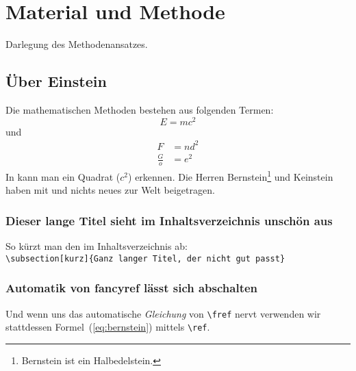 \chapter{Material und Methode}\label{chap:material und methode}
Darlegung des Methodenansatzes.

\section{Über Einstein}\label{sec:ueber einstein}
Die mathematischen Methoden bestehen aus folgenden Termen:
\begin{equation}
	\label{eq:einstein}
	E = mc^2
\end{equation}
und
\begin{align}
	\label{eq:bernstein}
	F &= nd^2\\
	\label{eq:keinstein}
	\frac{G}{o} &= e^2
\end{align}
In  kann man ein Quadrat ($c^2$) erkennen. Die Herren Bernstein\footnote{Bernstein ist ein Halbedelstein.} und Keinstein haben mit  und  nichts neues zur Welt beigetragen.

\subsection{Dieser lange Titel sieht im Inhaltsverzeichnis unschön aus}\label{sec:fancyref1}
So kürzt man den im Inhaltsverzeichnis ab:\\
\verb+\subsection[kurz]{Ganz langer Titel, der nicht gut passt}+
\subsection[Automatik von fancyref]{Automatik von fancyref lässt sich abschalten}\label{sec:fancyref}
Und wenn uns das automatische \emph{Gleichung} von \verb+\fref+ nervt verwenden wir stattdessen Formel~(\ref{eq:bernstein}) mittels \verb+\ref+.
\newpage